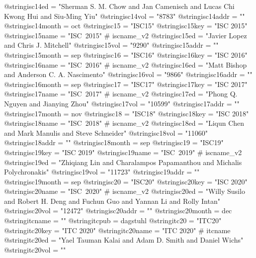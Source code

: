 @string{isc14ed =               "Sherman S. M. Chow and Jan Camenisch and Lucas Chi Kwong Hui and Siu-Ming Yiu"}
@string{isc14vol =              "8783"}
@string{isc14addr =             ""}
@string{isc14month =            oct}
@string{isc15 =                 "ISC15"}
@string{isc15key =              "ISC 2015"}
@string{isc15name =             "ISC~2015" # iscname_v2}
@string{isc15ed =               "Javier Lopez and Chris J. Mitchell"}
@string{isc15vol =              "9290"}
@string{isc15addr =             ""}
@string{isc15month =            sep}
@string{isc16 =                 "ISC16"}
@string{isc16key =              "ISC 2016"}
@string{isc16name =             "ISC~2016" # iscname_v2}
@string{isc16ed =               "Matt Bishop and Anderson C. A. Nascimento"}
@string{isc16vol =              "9866"}
@string{isc16addr =             ""}
@string{isc16month =            sep}
@string{isc17 =                 "ISC17"}
@string{isc17key =              "ISC 2017"}
@string{isc17name =             "ISC~2017" # iscname_v2}
@string{isc17ed =               "Phong Q. Nguyen and Jianying Zhou"}
@string{isc17vol =              "10599"}
@string{isc17addr =             ""}
@string{isc17month =            nov}
@string{isc18 =                 "ISC18"}
@string{isc18key =              "ISC 2018"}
@string{isc18name =             "ISC~2018" # iscname_v2}
@string{isc18ed =               "Liqun Chen and Mark Manulis and Steve Schneider"}
@string{isc18vol =              "11060"}
@string{isc18addr =             ""}
@string{isc18month =            sep}
@string{isc19 =                 "ISC19"}
@string{isc19key =              "ISC 2019"}
@string{isc19name =             "ISC~2019" # iscname_v2}
@string{isc19ed =               "Zhiqiang Lin and Charalampos Papamanthou and Michalis Polychronakis"}
@string{isc19vol =              "11723"}
@string{isc19addr =             ""}
@string{isc19month =            sep}
@string{isc20 =                 "ISC20"}
@string{isc20key =              "ISC 2020"}
@string{isc20name =             "ISC~2020" # iscname_v2}
@string{isc20ed =               "Willy Susilo and Robert H. Deng and Fuchun Guo and Yannan Li and Rolly Intan"}
@string{isc20vol =              "12472"}
@string{isc20addr =             ""}
@string{isc20month =            dec}
@string{itcname =               ""}
@string{itcpub =                dagstuhl}
@string{itc20 =                 "ITC20"}
@string{itc20key =              "ITC 2020"}
@string{itc20name =             "ITC 2020" # itcname}
@string{itc20ed =               "Yael Tauman Kalai and Adam D. Smith and Daniel Wichs"}
@string{itc20vol =              ""}
